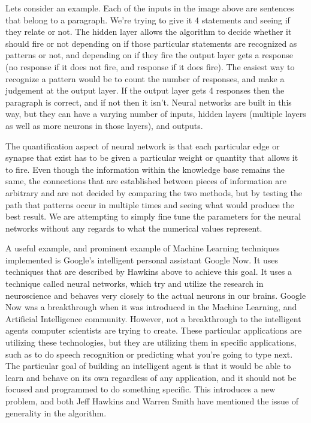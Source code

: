 \documentclass[11pt, oneside]{article}
\begin{document}
\par Lets consider an example. Each of the inputs in the image above are sentences that belong to a paragraph. We're trying to give it 4 statements and seeing if they relate or not. The hidden layer allows the algorithm to decide whether it should fire or not depending on if those particular statements are recognized as patterns or not, and depending on if they fire the output layer gets a response (no response if it does not fire, and response if it does fire). The easiest way to recognize a pattern would be to count the number of responses, and make a judgement at the output layer. If the output layer gets 4 responses then the paragraph is correct, and if not then it isn't. Neural networks are built in this way, but they can have a varying number of inputs, hidden layers (multiple layers as well as more neurons in those layers), and outputs. 

\par The quantification aspect of neural network is that each particular edge or synapse that exist has to be given a particular weight or quantity that allows it to fire. Even though the information within the knowledge base remains the same, the connections that are established between pieces of information are arbitrary and are not decided by comparing the two methods, but by testing the path that patterns occur in multiple times and seeing what would produce the best result. We are attempting to simply fine tune the parameters for the neural networks without any regards to what the numerical values represent.

\par A useful example, and prominent example of Machine Learning techniques implemented is Google's intelligent personal assistant Google Now. It uses techniques that are described by Hawkins above to achieve this goal. It uses a technique called neural networks, which try and utilize the research in neuroscience and behaves very closely to the actual neurons in our brains. Google Now was a breakthrough when it was introduced in the Machine Learning, and Artificial Intelligence community. However, not a breakthrough to the intelligent agents computer scientists are trying to create. These particular applications are utilizing these technologies, but they are utilizing them in specific applications, such as to do speech recognition or predicting what you're going to type next. The particular goal of building an intelligent agent is that it would be able to learn and behave on its own regardless of any application, and it should not be focused and programmed to do something specific. This introduces a new problem, and both Jeff Hawkins and Warren Smith have mentioned the issue of generality in the algorithm.
\end{document}
